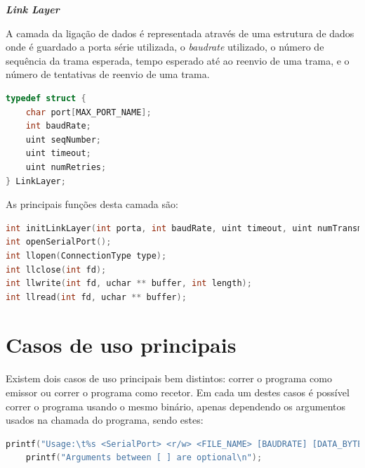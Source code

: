 \documentclass[a4paper, 11pt]{article}
\begin{document}
\large\textbf{\textit{Link Layer}}\\
\normalsize

A camada da ligação de dados é representada através de uma estrutura de dados onde é guardado a porta série utilizada, o \textit{baudrate} utilizado, o número de sequência da trama esperada, tempo esperado até ao reenvio de uma trama, e o número de tentativas de reenvio de uma trama.

\begin{lstlisting}[language=C]
typedef struct {
	char port[MAX_PORT_NAME];
	int baudRate;
	uint seqNumber;
	uint timeout;
	uint numRetries;
} LinkLayer;
\end{lstlisting}

As principais funções desta camada são:

\begin{lstlisting}[language=C]
int initLinkLayer(int porta, int baudRate, uint timeout, uint numTransmissions);
int openSerialPort();
int llopen(ConnectionType type);
int llclose(int fd);
int llwrite(int fd, uchar ** buffer, int length);
int llread(int fd, uchar ** buffer);
\end{lstlisting}

\section{Casos de uso principais}

Existem dois casos de uso principais bem distintos: correr o programa como emissor ou correr o programa como recetor. Em cada um destes casos é possível correr o programa usando o mesmo binário, apenas dependendo os argumentos usados na chamada do programa, sendo estes:

\begin{lstlisting}[language=C]
	printf("Usage:\t%s <SerialPort> <r/w> <FILE_NAME> [BAUDRATE] [DATA_BYTES] [NUM_RETRIES] [TIMEOUT]\n", progName);
	printf("Arguments between [ ] are optional\n");
\end{lstlisting}
\end{document}
